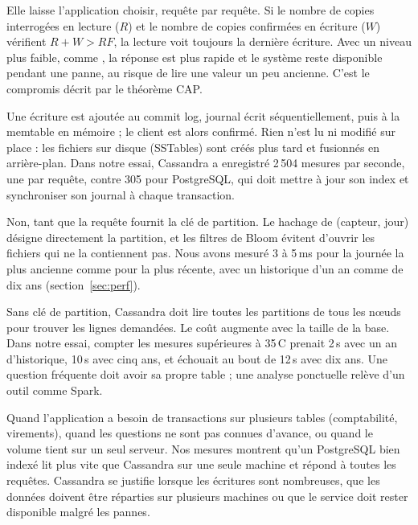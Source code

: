 \documentclass[11pt,a4paper]{article}
\newcommand{\cq}[1]{\texttt{\detokenize{#1}}}
\begin{document}
Elle laisse l'application choisir, requête par requête. Si le nombre de copies interrogées en lecture ($R$) et le nombre de copies confirmées en écriture ($W$) vérifient $R + W > RF$, la lecture voit toujours la dernière écriture. Avec un niveau plus faible, comme \cq{ONE}, la réponse est plus rapide et le système reste disponible pendant une panne, au risque de lire une valeur un peu ancienne. C'est le compromis décrit par le théorème CAP.

Une écriture est ajoutée au commit log, journal écrit séquentiellement, puis à la memtable en mémoire ; le client est alors confirmé. Rien n'est lu ni modifié sur place : les fichiers sur disque (SSTables) sont créés plus tard et fusionnés en arrière-plan. Dans notre essai, Cassandra a enregistré 2\,504 mesures par seconde, une par requête, contre 305 pour PostgreSQL, qui doit mettre à jour son index et synchroniser son journal à chaque transaction.

Non, tant que la requête fournit la clé de partition. Le hachage de (capteur, jour) désigne directement la partition, et les filtres de Bloom évitent d'ouvrir les fichiers qui ne la contiennent pas. Nous avons mesuré 3 à 5\,ms pour la journée la plus ancienne comme pour la plus récente, avec un historique d'un an comme de dix ans (section~\ref{sec:perf}).

\question{8. Pourquoi \cq{ALLOW FILTERING} est-il déconseillé ?}
Sans clé de partition, Cassandra doit lire toutes les partitions de tous les nœuds pour trouver les lignes demandées. Le coût augmente avec la taille de la base. Dans notre essai, compter les mesures supérieures à 35\,\textdegree C prenait 2\,s avec un an d'historique, 10\,s avec cinq ans, et échouait au bout de 12\,s avec dix ans. Une question fréquente doit avoir sa propre table ; une analyse ponctuelle relève d'un outil comme Spark.

Quand l'application a besoin de transactions sur plusieurs tables (comptabilité, virements), quand les questions ne sont pas connues d'avance, ou quand le volume tient sur un seul serveur. Nos mesures montrent qu'un PostgreSQL bien indexé lit plus vite que Cassandra sur une seule machine et répond à toutes les requêtes. Cassandra se justifie lorsque les écritures sont nombreuses, que les données doivent être réparties sur plusieurs machines ou que le service doit rester disponible malgré les pannes.
\end{document}
